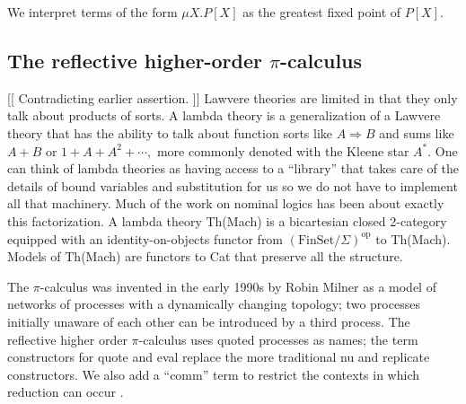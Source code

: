 \documentclass{article}
\newcommand{\FinSet}{\mathrm{FinSet}}
\newcommand{\op}{\mathrm{op}}
\begin{document}
We interpret terms of the form $\mu X.P[X]$ as the greatest fixed point of $P[X].$

\subsection{The reflective higher-order $\pi$-calculus}

[[ Contradicting earlier assertion. ]] Lawvere theories are limited in that they only talk about products of sorts.  A lambda theory is a generalization of a Lawvere theory that has the ability to talk about function sorts like $A \Rightarrow B$ and sums like $A+B$ or $1 + A + A^2 + \cdots,$ more commonly denoted with the Kleene star $A^*.$  One can think of lambda theories as having access to a ``library'' that takes care of the details of bound variables and substitution for us so we do not have to implement all that machinery.  Much of the work on nominal logics has been about exactly this factorization.  A lambda theory Th(Mach) is a bicartesian closed 2-category equipped with an identity-on-objects functor from $(\FinSet/\Sigma)^{\op}$ to Th(Mach).  Models of Th(Mach) are functors to Cat that preserve all the structure.

The $\pi$-calculus was invented in the early 1990s by Robin Milner as a model of networks of processes with a dynamically changing topology; two processes initially unaware of each other can be introduced by a third process.  The reflective higher order $\pi$-calculus uses quoted processes as names; the term constructors for quote and eval replace the more traditional nu and replicate constructors.  We also add a ``comm'' term to restrict the contexts in which reduction can occur \cite{HDRA}.
\end{document}
